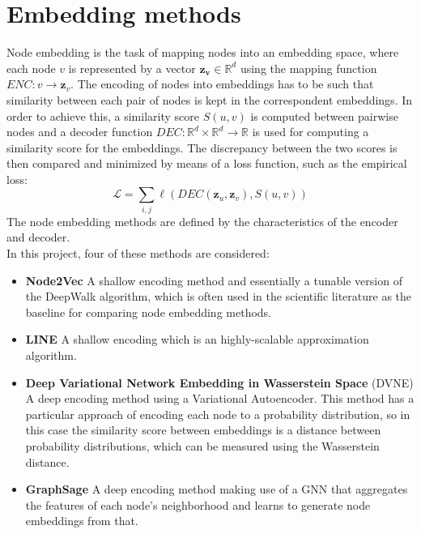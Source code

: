 \section{Embedding methods} \label{sec:embedding}
Node embedding is the task of mapping nodes into an embedding space, where each node \(v\) is represented by a vector \(\mathbf{z_v} \in \mathbb{R}^d\) using the mapping function \(ENC: v \to \mathbf{z}_v\).
The encoding of nodes into embeddings has to be such that similarity between each pair of nodes is kept in the correspondent embeddings. 
In order to achieve this, a similarity score \(S(u, v)\) is computed between pairwise nodes and a decoder function 
\(DEC: \mathbb{R}^d \times \mathbb{R}^d \to \mathbb{R}\) is used for computing a similarity score for the embeddings. 
The discrepancy between the two scores is then compared and minimized by means of a loss function, such as the empirical loss:
\[ \mathcal{L} = \sum_{i,j} \ell(DEC(\mathbf{z}_u, \mathbf{z}_v), S(u, v)) \]
The node embedding methods are defined by the characteristics of the encoder and decoder. 
\\\newline
In this project, four of these methods are considered:
\begin{itemize}
    \item \textbf{Node2Vec} \cite{node2vec} A shallow encoding method and essentially a tunable version of the DeepWalk algorithm, which is often used in the scientific literature as the baseline for comparing node embedding methods.
    \item \textbf{LINE} \cite{LINE} A shallow encoding which is an highly-scalable approximation algorithm.
    \item \textbf{Deep Variational Network Embedding in Wasserstein Space} (DVNE) \cite{DVNE} A deep encoding method using a Variational Autoencoder. 
    This method has a particular approach of encoding each node to a probability distribution, so in this case the similarity score between embeddings is a distance between probability distributions, which can be measured using the Wasserstein distance.
    \item \textbf{GraphSage} \cite{GraphSage} A deep encoding method making use of a GNN that aggregates the features of each node's neighborhood and learns to generate node embeddings from that.
\end{itemize}